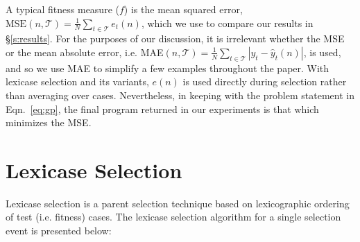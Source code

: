 \documentclass[twoside]{article}
\begin{document}
A typical fitness measure ($f$) is the mean squared error, $\text{MSE}(n,\mathcal{T}) = \frac{1}{N} \sum_{t \in \mathcal{T}}{e_t(n)}$, which we use to compare our results in \S\ref{s:results}. For the purposes of our discussion, it is irrelevant whether the MSE or the mean absolute error, i.e. MAE$(n,\mathcal{T}) = \frac{1}{N} \sum_{t \in \mathcal{T}}{|y_t - \hat{y}_t(n)|}$, is used, and so we use MAE to simplify a few examples throughout the paper. With lexicase selection and its variants, $e(n)$ is used directly during selection rather than averaging over cases. Nevertheless, in keeping with the problem statement in Eqn.~\ref{eq:gp}, the final program returned in our experiments is that which minimizes the MSE.

%

\section{Lexicase Selection}\label{s:lex}
Lexicase selection is a parent selection technique based on lexicographic ordering of test (i.e. fitness) cases. The lexicase selection algorithm for a single selection event is presented below: 
\end{document}
